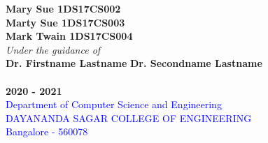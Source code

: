 \documentclass[ 12pt,a4paper,twocolumn,fleqn]{article}
\begin{document}
\begin{center}
\textbf{Mary Sue \space 1DS17CS002} \\
\textbf{Marty Sue \space 1DS17CS003} \\
\textbf{Mark Twain \space 1DS17CS004} \\
\textit{Under the guidance of} \\
\textbf{Dr. Firstname Lastname}
\hfill
\textbf{Dr. Secondname Lastname} \\
\hfill
{} \\
\Large{\textbf{2020 - 2021}} \\
\textcolor{blue}{\Large{Department of Computer Science and Engineering}} \\
\textcolor{blue}{\Large{DAYANANDA SAGAR COLLEGE OF ENGINEERING}} \\
\textcolor{blue}{\Large{Bangalore - 560078}} \\
\end{center}
\newpage
  \pagestyle{fancy}
\thisfancypage{%
  \setlength{\fboxsep}{20pt}\doublebox}{}
\end{document}
